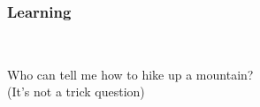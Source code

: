 \begin{frame}
  \frametitle{Learning}
  \begin{module}[id=storyBegin2]
    \\
    \begin{center}
    Who can tell me how to hike up a mountain?\\
    \vspace{3mm}
    (It's not a trick question)
    \vspace{1cm}
    \end{center}
  \end{module}
\end{frame}

